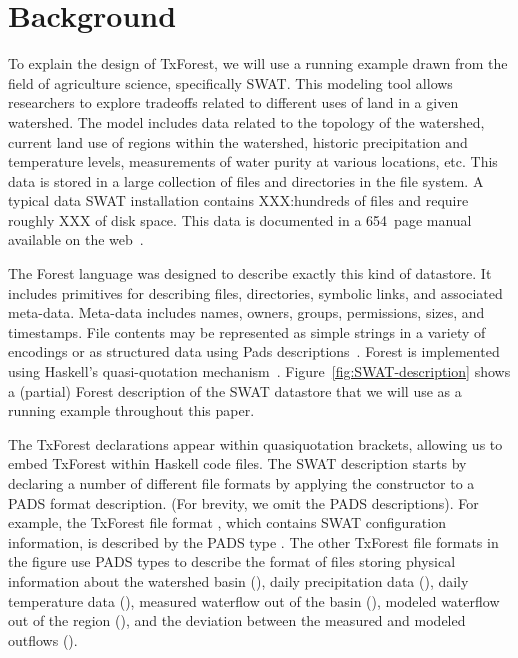 \section{Background}
\label{sec:Background}


To explain the design of TxForest, we will use a running example drawn
from the field of agriculture science, specifically SWAT.  This
modeling tool allows researchers to explore tradeoffs related to
different uses of land in a given watershed.  The model includes data
related to the topology of the watershed, current land use of regions
within the watershed, historic precipitation and temperature levels,
measurements of water purity at various locations, etc.  This data is
stored in a large collection of files and directories in the file
system.  A typical data SWAT installation contains XXX:hundreds of
files and require roughly XXX of disk space.  This data is documented
in a 654~page manual available on the web~\cite{SWAT-IO-Documentation}.

The Forest language was designed to describe exactly this kind of
datastore.  It includes primitives for describing files,
directories, symbolic links, and associated meta-data.  Meta-data
includes names, owners, groups, permissions, sizes, and timestamps.
File contents may be represented as simple strings in a variety of
encodings or as structured data using Pads
descriptions~\cite{fisher+:pads,fisher-walker:icdt}. Forest is
implemented using Haskell's quasi-quotation
mechanism~\cite{Mainland:quasi}.  Figure~\ref{fig:SWAT-description}
shows a (partial) Forest description of the SWAT datastore
that we will use as a running example throughout this paper.

The TxForest declarations appear within \cd{[txforest|...|]}
quasiquotation brackets, allowing us to embed TxForest within Haskell
code files.  The SWAT description starts by declaring a number of
different file formats by applying the  constructor to
a PADS format description.  (For brevity, we omit the PADS
descriptions).   For example, the TxForest file format
, which contains SWAT configuration information,
is described by the PADS type .
The other TxForest file formats in the figure use PADS types to
describe the format of files storing 
physical information about the watershed basin (),
daily precipitation data (),
daily temperature data (),
measured waterflow out of the basin (),
modeled waterflow out of the region (),
and the deviation between the measured and modeled outflows ().

